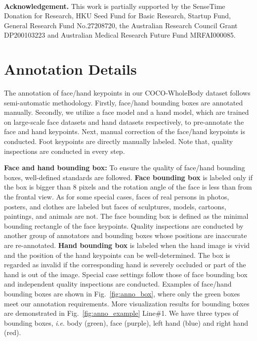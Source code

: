 \documentclass[runningheads]{llncs}
\newcommand{\ie}{\textit{i}.\textit{e}. }
\begin{document}
	~\\
	\textbf{Acknowledgement.} This work is partially supported by the SenseTime Donation for Research, HKU Seed Fund for Basic Research, Startup Fund, General Research Fund No.27208720, the Australian Research Council Grant DP200103223 and Australian Medical Research Future Fund MRFAI000085.
	

	
	
	\appendix
	
	\clearpage
	
	\section{Annotation Details}
	
	The annotation of face/hand keypoints in our COCO-WholeBody dataset follows semi-automatic methodology. Firstly, face/hand bounding boxes are annotated manually. Secondly, we utilize a face model and a hand model, which are trained on large-scale face datasets and hand datasets respectively, to pre-annotate the face and hand keypoints. Next, manual correction of the face/hand keypoints is conducted. Foot keypoints are directly manually labeled. Note that, quality inspections are conducted in every step.
	
	\textbf{Face and hand bounding box:}
	To ensure the quality of face/hand bounding boxes, well-defined standards are followed. \textbf{Face bounding box} is labeled only if the box is bigger than 8 pixels and the rotation angle of the face is less than  from the frontal view. As for some special cases, faces of real persons in photos, posters, and clothes are labeled but faces of sculptures, models, cartoons, paintings, and animals are not. The face bounding box is defined as the minimal bounding rectangle of the face keypoints. Quality inspections are conducted by another group of annotators and bounding boxes whose positions are inaccurate are re-annotated. \textbf{Hand bounding box} is labeled when the hand image is vivid and the position of the hand keypoints can be well-determined. The box is regarded as invalid if the corresponding hand is severely occluded or part of the hand is out of the image. Special case settings follow those of face bounding box and independent quality inspections are conducted. Examples of face/hand bounding boxes are shown in Fig.~\ref{fig:anno_box}, where only the green boxes meet our annotation requirements. More visualization results for bounding boxes are demonstrated in Fig.~\ref{fig:anno_example} Line\#1. We have three types of bounding boxes, \ie body (green), face (purple), left hand (blue) and right hand (red). 
	
\end{document}
